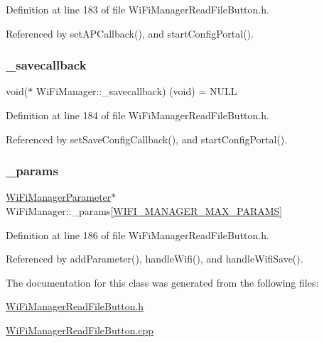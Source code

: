 Definition at line 183 of file Wi\+Fi\+Manager\+Read\+File\+Button.\+h.



Referenced by set\+A\+P\+Callback(), and start\+Config\+Portal().

\mbox{\label{class_wi_fi_manager_a9a316060184788e33e71d88101cb2e0d}} 
\subsubsection{\texorpdfstring{\+\_\+savecallback}{\_savecallback}}
{\footnotesize\ttfamily void($\ast$ Wi\+Fi\+Manager\+::\+\_\+savecallback) (void) = N\+U\+LL\hspace{0.3cm}{\ttfamily [private]}}



Definition at line 184 of file Wi\+Fi\+Manager\+Read\+File\+Button.\+h.



Referenced by set\+Save\+Config\+Callback(), and start\+Config\+Portal().

\mbox{\label{class_wi_fi_manager_a355ce9bbaab94baffd1c83de9b166fea}} 
\subsubsection{\texorpdfstring{\+\_\+params}{\_params}}
{\footnotesize\ttfamily \hyperlink{class_wi_fi_manager_parameter}{Wi\+Fi\+Manager\+Parameter}$\ast$ Wi\+Fi\+Manager\+::\+\_\+params\mbox{[}\hyperlink{_wi_fi_manager_read_file_button_8h_a5a8c6577015e3b2e82cf4bdab1475310}{W\+I\+F\+I\+\_\+\+M\+A\+N\+A\+G\+E\+R\+\_\+\+M\+A\+X\+\_\+\+P\+A\+R\+A\+MS}\mbox{]}\hspace{0.3cm}{\ttfamily [private]}}



Definition at line 186 of file Wi\+Fi\+Manager\+Read\+File\+Button.\+h.



Referenced by add\+Parameter(), handle\+Wifi(), and handle\+Wifi\+Save().



The documentation for this class was generated from the following files\+:\begin{DoxyCompactItemize}
\item 
\hyperlink{_wi_fi_manager_read_file_button_8h}{Wi\+Fi\+Manager\+Read\+File\+Button.\+h}\item 
\hyperlink{_wi_fi_manager_read_file_button_8cpp}{Wi\+Fi\+Manager\+Read\+File\+Button.\+cpp}\end{DoxyCompactItemize}

